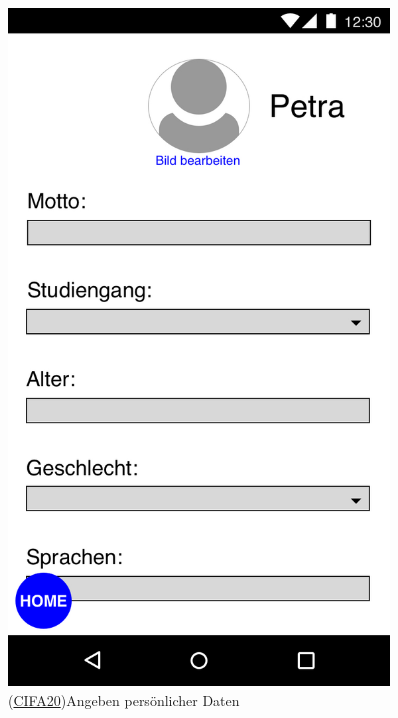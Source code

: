 \documentclass[a4paper]{scrreprt}
\begin{document}
\begin{figure}[H]
	\centering 
	\begin{minipage}[b]{0.48\textwidth} 
		\centering 
		\includegraphics[width=0.9\textwidth]{res/GUI/03.jpeg} 
		\label{Fig.3}
		(\hyperlink{cifa20}{CIFA20})Angeben persönlicher Daten
	\end{minipage}
	\begin{minipage}[b]{0.48\textwidth} 
		\centering 

\end{minipage}
\end{figure}
\end{document}
